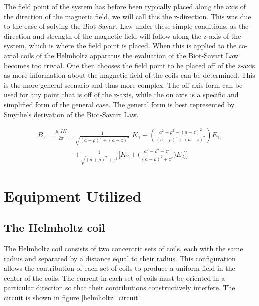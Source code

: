 \documentclass[a4paper]{article}
\begin{document}
\qq The field point of the system has before been typically placed along the axis of
the direction of the magnetic field, we will call this the z-direction. This was
due to the ease of solving the Biot-Savart Law under these simple conditions, as
the direction and strength of the magnetic field will follow along the z-axis of
the system, which is where the field point is placed. When this is applied to
the co-axial coils of the Helmholtz apparatus the evaluation of the Biot-Savart
Law becomes too trivial. One then chooses the field point to be placed off of
the z-axis as more information about the magnetic field of the coils can be
determined. This is the more general scenario and thus more complex. The off
axis form can be used for any point that is off of the z-axis, while the on axis
is a specific and simplified form of the general case. The general form is best
represented by Smythe's derivation of the Biot-Savart Law.

\begin{align} 
    B_z = \frac{\mu_0IN}{2\pi}
    \Big[&
        \frac{1}{\sqrt{(a+\rho)^2 + (a-z)^2}}
        \big[
            K_1 + \left(\frac{a^2 -\rho^2 - (a - z)^2}{(a-\rho)^2 + (a - z)^2} \right) E_1 
        \big] \label{eq:longBiotSavart} \\
            & + \frac{1}{\sqrt{(a + \rho)^2 + z^2}}
        \big[
            K_2 + \big(\frac{a^2 - \rho^2 - z^2}{(a - \rho)^2 + z^2}\big) E_2 
        \big] 
    \Big] \nonumber
\end{align}

\section{Equipment Utilized}


\subsection{The Helmholtz coil}

\qq The Helmholtz coil consists of two concentric sets of coils, each with the same
radius and separated by a distance equal to their radius. This configuration
allows the contribution of each set of coils to produce a uniform field in the
center of the coils. The current in each set of coils must be oriented in a
particular direction so that their contributions constructively interfere. The
circuit is shown in figure \ref{helmholtz_circuit}.
\end{document}
